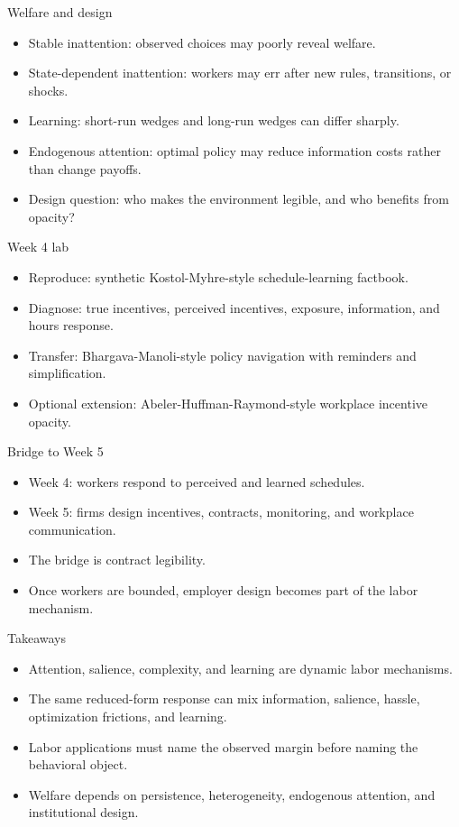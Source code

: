 \documentclass[aspectratio=169,11pt]{beamer}
\begin{document}
\begin{frame}{Welfare and design}
\begin{itemize}
    \item Stable inattention: observed choices may poorly reveal welfare.
    \item State-dependent inattention: workers may err after new rules, transitions, or shocks.
    \item Learning: short-run wedges and long-run wedges can differ sharply.
    \item Endogenous attention: optimal policy may reduce information costs rather than change payoffs.
    \item Design question: who makes the environment legible, and who benefits from opacity?
\end{itemize}
\end{frame}

\begin{frame}{Week 4 lab}
\begin{itemize}
    \item Reproduce: synthetic Kostol-Myhre-style schedule-learning factbook.
    \item Diagnose: true incentives, perceived incentives, exposure, information, and hours response.
    \item Transfer: Bhargava-Manoli-style policy navigation with reminders and simplification.
    \item Optional extension: Abeler-Huffman-Raymond-style workplace incentive opacity.
\end{itemize}
\end{frame}

\begin{frame}{Bridge to Week 5}
\begin{itemize}
    \item Week 4: workers respond to perceived and learned schedules.
    \item Week 5: firms design incentives, contracts, monitoring, and workplace communication.
    \item The bridge is contract legibility.
    \item Once workers are bounded, employer design becomes part of the labor mechanism.
\end{itemize}
\end{frame}

\begin{frame}{Takeaways}
\begin{itemize}
    \item Attention, salience, complexity, and learning are dynamic labor mechanisms.
    \item The same reduced-form response can mix information, salience, hassle, optimization frictions, and learning.
    \item Labor applications must name the observed margin before naming the behavioral object.
    \item Welfare depends on persistence, heterogeneity, endogenous attention, and institutional design.
\end{itemize}
\end{frame}
\end{document}
